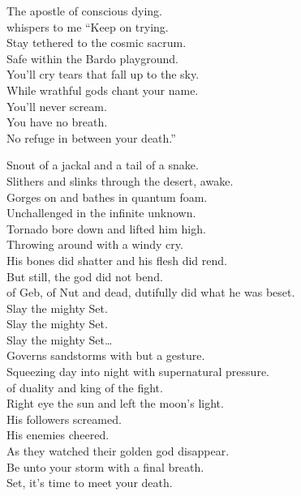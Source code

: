 The apostle of conscious dying. \\
whispers to me ``Keep on trying. \\
Stay tethered to the cosmic sacrum. \\
Safe within the Bardo playground. \\
You'll cry tears that fall up to the sky. \\
While wrathful gods chant your name. \\
You'll never scream. \\
You have no breath. \\
No refuge in between your death.'' \\



Snout of a jackal and a tail of a snake. \\
Slithers and slinks through the desert, awake. \\
Gorges on  and bathes in quantum foam. \\
Unchallenged in the infinite unknown. \\

Tornado bore down and lifted him high. \\
Throwing  around with a windy cry. \\
His bones did shatter and his flesh did rend. \\
But still, the god did not bend. \\

 of Geb, of Nut and dead, dutifully did what he was beset. \\

Slay the mighty Set. \\
Slay the mighty Set. \\
Slay the mighty Set… \\

Governs sandstorms with but a gesture. \\
Squeezing day into night with supernatural pressure. \\
 of duality and king of the fight. \\
Right eye the sun and left the moon's light. \\
His followers screamed. \\
His enemies cheered. \\
As they watched their golden god disappear. \\
Be unto your storm with a final breath. \\
Set, it's time to meet your death. \\

